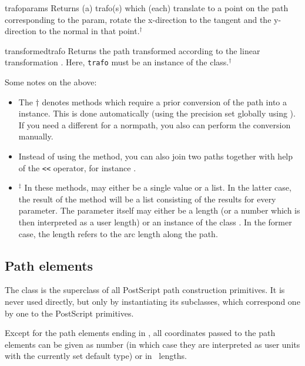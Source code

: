 \begin{methoddesc}{trafo}{params}
  Returns (a) trafo(s) which (each) translate to a point on the path
  corresponding to the param, rotate the x-direction to the tangent
  and the y-direction to the normal in that point.$^\dagger$
\end{methoddesc}

\begin{methoddesc}{transformed}{trafo}
  Returns the path transformed according to the linear transformation
  . Here, \texttt{trafo} must be an instance of the
   class.$^\dagger$
\end{methoddesc}

Some notes on the above:
\begin{itemize}
\item The $\dagger$ denotes methods which require a prior
  conversion of the path into a  instance. This is
  done automatically (using the precision  set globally
  using ). If you need a different  for
  a normpath, you also can perform the conversion manually. 
\item Instead of using the  method, you can also join two
paths together with help of the \verb|<<| operator, for instance
. 
\item $^\ddagger$ In these methods,  may either be a
  single value or a list. In the latter case, the result of the method
  will be a list consisting of the results for every parameter.  The
  parameter itself may either be a length (or a number which is then
  interpreted as a user length) or an instance of the class
  . In the former case, the length refers to the
  arc length along the path. 
\end{itemize}

\subsection{Path elements}

\label{path:pathitem}

The class  is the superclass of all PostScript path
construction primitives. It is never used directly, but only by
instantiating its subclasses, which correspond one by one to the
PostScript primitives. 

Except for the path elements ending in , all coordinates
passed to the path elements can be given as number (in which case they
are interpreted as user units with the currently set default type) or in
\PyX\ lengths. 

